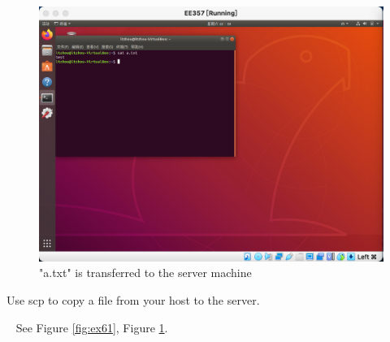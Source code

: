 \begin{figure}[hb]
  \begin{center}
  \includegraphics[width=12cm]{img/lab1/ex6-1}
  \caption{"a.txt" is transferred to the server machine}
  \label{fig:ex62}
  \end{center}
\end{figure}

\begin{exercise}[]{Use scp to copy a file from your host to the server.}
  \begin{solution}
  \par{~}
  See Figure \ref{fig:ex61}, Figure \ref{fig:ex62}.

  \end{solution}
  \label{ex6}
\end{exercise}
